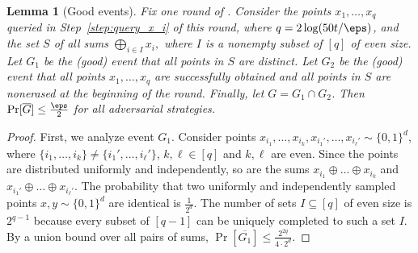 \documentclass[11pt]{article}
\numberwithin{equation}{section}
\newtheorem{lemma}[theorem]{Lemma}
\theoremstyle{definition}
\theoremstyle{plain}
\begin{document}
\begin{lemma}[Good events]
\label{lem:distinct_and_nonerased}
Fix one round of . Consider the points  $x_1,\dots, x_q$ queried in Step~\ref{step:query_x_i} of this round, where $q = 2\log(50t/\eps)$,
and the set $S$ of all sums $\bigoplus_{i\in I}x_i,$ where $I$ is a nonempty subset of $[q]$ of even size.
Let $G_1$ be the (good) event that all points in $S$
are distinct. Let $G_2$ be the (good) event that all points $x_1,\dots,x_q$
are successfully obtained and all points in $S$
are nonerased at the beginning of the round. Finally, let $G = G_1 \cap G_2$. Then $\Pr[\overline{G}] \le \frac{\eps}{2}$ for all adversarial strategies.
\end{lemma}
\begin{proof}
First, we analyze event $G_1$. Consider points $x_{i_1}, \dots, x_{i_{k}}, x_{i_1'}, \dots, x_{i_{\ell}'} \sim \{0,1\}^d$,  where $\{i_1, \dots, i_k\} \neq \{i_1', \dots, i_\ell'\}$, $k, \ell \in [q]$ and $k, \ell$ are even. Since the points are distributed uniformly and independently, so are the sums $x_{i_1} \oplus\dots\oplus x_{i_{k}}$ and $x_{i_1'}\oplus\dots\oplus x_{i_{\ell}'}$. The probability that two uniformly and independently sampled points $x,y \sim \{0,1\}^d$ are identical is $\frac{1}{2^d}$. The number of sets $I \subseteq [q]$ of even size is $2^{q-1}$ because every subset of $[q-1]$ can be uniquely completed to such a set $I$.
%
%
%
%
%
%
By a union bound over all pairs of sums, $\Pr[\overline{G_1}] 
%
\leq \frac{2^{2q}}{4 \cdot 2^d}$. 


\end{proof}
\end{document}
